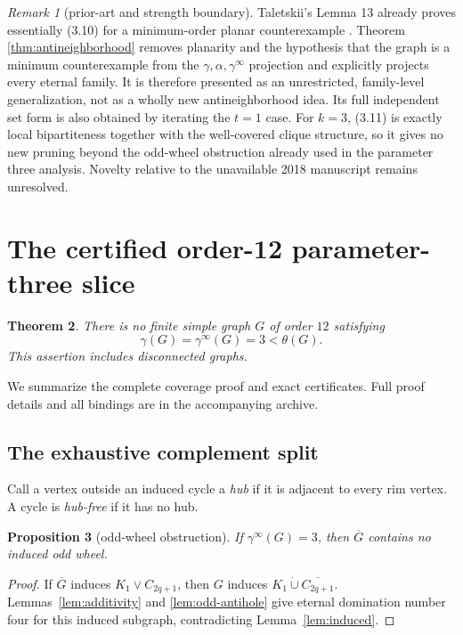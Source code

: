 \documentclass[11pt]{article}
\newtheorem{theorem}{Theorem}[section]
\newtheorem{proposition}[theorem]{Proposition}
\theoremstyle{definition}
\theoremstyle{remark}
\newtheorem{remark}[theorem]{Remark}
\newcommand{\gaminf}{\gamma^{\infty}}
\begin{document}
\begin{remark}[prior-art and strength boundary]\label{rem:projection-prior}
Taletskii's Lemma 13 already proves essentially (3.10) for a minimum-order
planar counterexample \cite{Taletskii2024}.  Theorem
\ref{thm:antineighborhood} removes planarity and
the hypothesis that the graph is a minimum counterexample from the
\(\gamma,\alpha,\gaminf\) projection and explicitly projects every eternal
family.  It is therefore presented as an unrestricted, family-level
generalization, not as a wholly new antineighborhood idea.  Its full
independent set form is also obtained by iterating the \(t=1\) case.
For \(k=3\), (3.11) is exactly local bipartiteness together with the
well-covered clique structure, so it gives no new pruning beyond the
odd-wheel obstruction already used in the parameter three analysis.
Novelty relative to the unavailable 2018 manuscript remains unresolved.
\end{remark}

\section{The certified order-12 parameter-three slice}\label{sec:k3}

\begin{theorem}\label{thm:k3}
There is no finite simple graph \(G\) of order \(12\) satisfying
\[
  \gamma(G)=\gaminf(G)=3<\theta(G).
\tag{4.1}
\]
This assertion includes disconnected graphs.
\end{theorem}

We summarize the complete coverage proof and exact certificates.  Full
proof details and all bindings are in the accompanying archive.

\subsection{The exhaustive complement split}

Call a vertex outside an induced cycle a \emph{hub} if it is adjacent to
every rim vertex.  A cycle is \emph{hub-free} if it has no hub.

\begin{proposition}[odd-wheel obstruction]\label{prop:wheel}
If \(\gaminf(G)=3\), then \(\overline G\) contains no induced odd wheel.
\end{proposition}

\begin{proof}
If \(\overline G\) induces \(K_1\vee C_{2q+1}\), then \(G\) induces
\(K_1\mathbin{\dot\cup}\overline{C_{2q+1}}\).
Lemmas~\ref{lem:additivity} and \ref{lem:odd-antihole} give eternal
domination number four for this induced subgraph, contradicting
Lemma~\ref{lem:induced}.
\end{proof}
\end{document}
